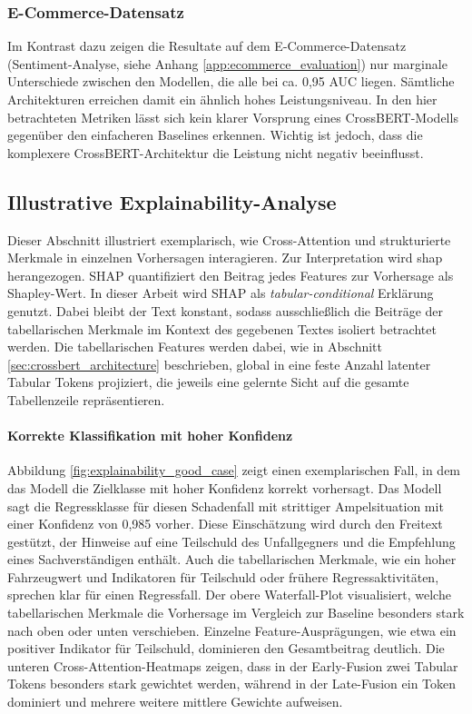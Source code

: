 \subsubsection{E-Commerce-Datensatz}
Im Kontrast dazu zeigen die Resultate auf dem E-Commerce-Datensatz (Sentiment-Analyse, siehe Anhang \ref{app:ecommerce_evaluation}) nur marginale Unterschiede zwischen den Modellen, die alle bei ca. 0{,}95 AUC liegen. Sämtliche Architekturen erreichen damit ein ähnlich hohes Leistungsniveau. In den hier betrachteten Metriken lässt sich kein klarer Vorsprung eines CrossBERT-Modells gegenüber den einfacheren Baselines erkennen. Wichtig ist jedoch, dass die komplexere CrossBERT-Architektur die Leistung nicht negativ beeinflusst.

\newpage
\subsection{Illustrative Explainability-Analyse}
\label{sec:res_explainability}

Dieser Abschnitt illustriert exemplarisch, wie Cross-Attention und strukturierte Merkmale in einzelnen Vorhersagen interagieren. Zur Interpretation wird \gls{shap} \cite{Lundberg2017} herangezogen. SHAP quantifiziert den Beitrag jedes Features zur Vorhersage als Shapley-Wert. In dieser Arbeit wird SHAP als \textit{tabular-conditional} Erklärung genutzt. Dabei bleibt der Text konstant, sodass ausschließlich die Beiträge der tabellarischen Merkmale im Kontext des gegebenen Textes isoliert betrachtet werden. Die tabellarischen Features werden dabei, wie in Abschnitt \ref{sec:crossbert_architecture} beschrieben, global in eine feste Anzahl latenter Tabular Tokens projiziert, die jeweils eine gelernte Sicht auf die gesamte Tabellenzeile repräsentieren.

\paragraph{Korrekte Klassifikation mit hoher Konfidenz}
Abbildung \ref{fig:explainability_good_case} zeigt einen exemplarischen Fall, in dem das Modell die Zielklasse mit hoher Konfidenz korrekt vorhersagt. 
Das Modell sagt die Regressklasse für diesen Schadenfall mit strittiger Ampelsituation mit einer Konfidenz von 0{,}985 vorher. Diese Einschätzung wird durch den Freitext gestützt, der Hinweise auf eine Teilschuld des Unfallgegners und die Empfehlung eines Sachverständigen enthält. Auch die tabellarischen Merkmale, wie ein hoher Fahrzeugwert und Indikatoren für Teilschuld oder frühere Regressaktivitäten, sprechen klar für einen Regressfall. 
Der obere Waterfall-Plot visualisiert, welche tabellarischen Merkmale die Vorhersage im Vergleich zur Baseline besonders stark nach oben oder unten verschieben. Einzelne Feature-Ausprägungen, wie etwa ein positiver Indikator für Teilschuld, dominieren den Gesamtbeitrag deutlich. Die unteren Cross-Attention-Heatmaps zeigen, dass in der Early-Fusion zwei Tabular Tokens besonders stark gewichtet werden, während in der Late-Fusion ein Token dominiert und mehrere weitere mittlere Gewichte aufweisen.

